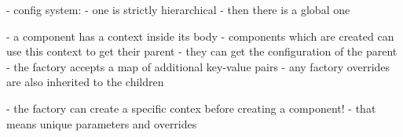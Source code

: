 - config system:
- one is strictly hierarchical
- then there is a global one

- a component has a context inside its body
- components which are created can use this context to get their parent
- they can get the configuration of the parent
- the factory accepts a map of additional key-value pairs
- any factory overrides are also inherited to the children

- the factory can create a specific contex before creating a component!
- that means unique parameters and overrides

